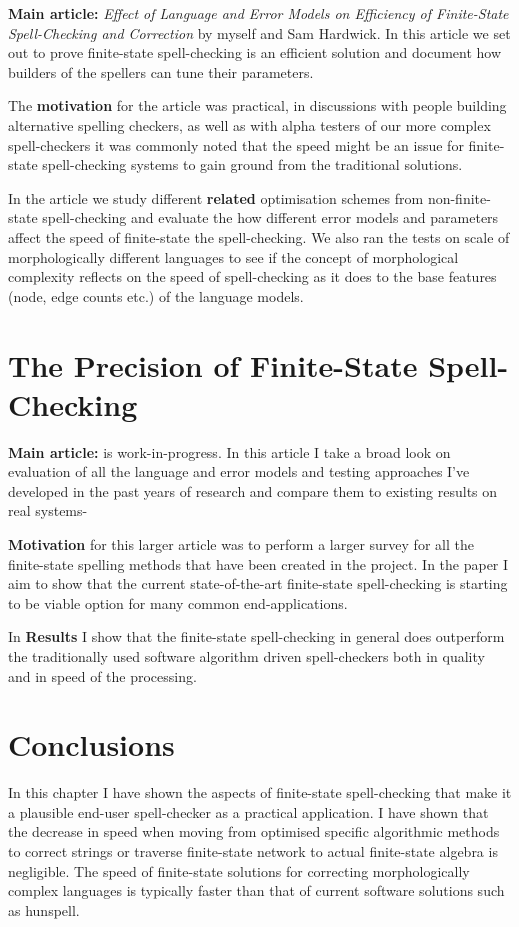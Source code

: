 \documentclass[officiallayout,draft]{unihelcompling}
\begin{document}
\textbf{Main article:} \emph{Effect of Language and Error Models on Efficiency
of Finite-State Spell-Checking and Correction} by myself and Sam Hardwick. In
this article we set out to prove finite-state spell-checking is an efficient
solution and document how builders of the spellers can tune their parameters.

The \textbf{motivation} for the article was practical, in discussions with
people building alternative spelling checkers, as well as with alpha testers of
our more complex spell-checkers it was commonly noted that the speed might be
an issue for finite-state spell-checking systems to gain ground from the
traditional solutions. 

In the article we study different \textbf{related} optimisation schemes from
non-finite-state spell-checking and evaluate the how different error models and
parameters affect the speed of finite-state the spell-checking. We also ran the
tests on scale of morphologically different languages to see if the concept of
morphological complexity reflects on the speed of spell-checking as it does to
the base features (node, edge counts etc.) of the language models.

\section{The Precision of Finite-State Spell-Checking}

\textbf{Main article:} is work-in-progress. In this article I take a broad
look on evaluation of all the language and error models and testing approaches
I've developed in the past years of research and compare them to existing
results on real systems-

\textbf{Motivation} for this larger article was to perform a larger survey
for all the finite-state spelling methods that have been created in the
project. In the paper I aim to show that the current state-of-the-art
finite-state spell-checking is starting to be viable option for many
common end-applications.

In \textbf{Results} I show that the finite-state spell-checking in general
does outperform the traditionally used software algorithm driven spell-checkers
both in quality and in speed of the processing.

\section{Conclusions}

In this chapter I have shown the aspects of finite-state spell-checking that
make it a plausible end-user spell-checker as a practical application. I have
shown that the decrease in speed when moving from optimised specific
algorithmic methods to correct strings or traverse finite-state network to
actual finite-state algebra is negligible. The speed of finite-state solutions
for correcting morphologically complex languages is typically faster than
that of current software solutions such as hunspell.
\end{document}
